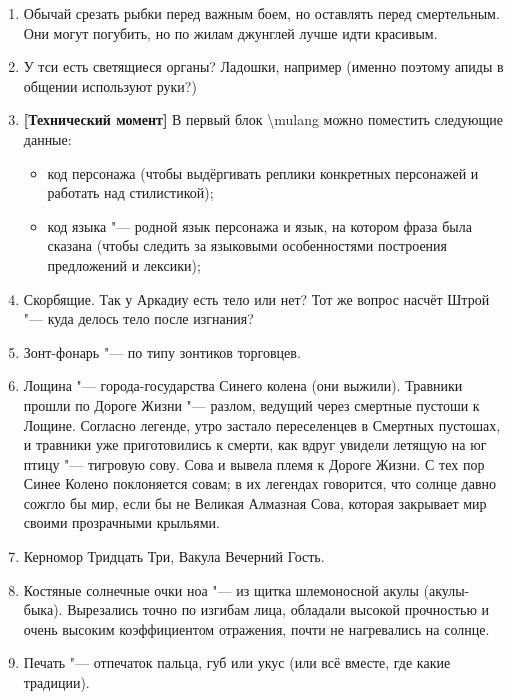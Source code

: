 \begin{enumerate}
\item Обычай срезать рыбки перед важным боем, но оставлять перед смертельным.
Они могут погубить, но по жилам джунглей лучше идти красивым.

\item У тси есть светящиеся органы?
Ладошки, например (именно поэтому апиды в общении используют руки?)

\item \textbf{[Технический момент]} В первый блок \textbackslash mulang можно поместить следующие данные:

\begin{itemize}
\item код персонажа (чтобы выдёргивать реплики конкретных персонажей и работать над стилистикой);
\item код языка "--- родной язык персонажа и язык, на котором фраза была сказана (чтобы следить за языковыми особенностями построения предложений и лексики);
\end{itemize}

\item Скорбящие.
Так у Аркадиу есть тело или нет?
Тот же вопрос насчёт Штрой "--- куда делось тело после изгнания?

\item Зонт-фонарь "--- по типу зонтиков торговцев.

\item Лощина "--- города-государства Синего колена (они выжили).
Травники прошли по Дороге Жизни "--- разлом, ведущий через смертные пустоши к Лощине.
Согласно легенде, утро застало переселенцев в Смертных пустошах, и травники уже приготовились к смерти, как вдруг увидели летящую на юг птицу "--- тигровую сову.
Сова и вывела племя к Дороге Жизни.
С тех пор Синее Колено поклоняется совам;
в их легендах говорится, что солнце давно сожгло бы мир, если бы не Великая Алмазная Сова, которая закрывает мир своими прозрачными крыльями.

\item Керномор Тридцать Три, Вакула Вечерний Гость.

\item Костяные солнечные очки ноа "--- из щитка шлемоносной акулы (акулы-быка).
Вырезались точно по изгибам лица, обладали высокой прочностью и очень высоким коэффициентом отражения, почти не нагревались на солнце.

\item Печать "--- отпечаток пальца, губ или укус (или всё вместе, где какие традиции).


\end{enumerate}
